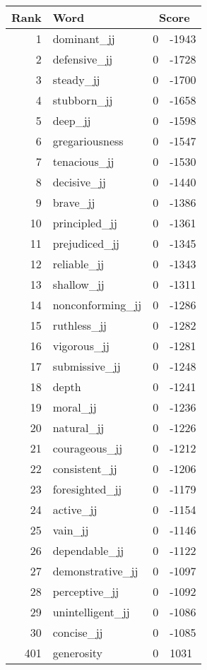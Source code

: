 \begin{longtable}[!htbp]{| rlr@{.}l |}
    \hline
    \textbf{Rank} & \textbf{Word} & \multicolumn{2}{c|}{\textbf{Score}} \\
    \hline
    \endhead
    1 & dominant\_jj & 0 & -1943 \\
    2 & defensive\_jj & 0 & -1728 \\
    3 & steady\_jj & 0 & -1700 \\
    4 & stubborn\_jj & 0 & -1658 \\
    5 & deep\_jj & 0 & -1598 \\
    6 & gregariousness & 0 & -1547 \\
    7 & tenacious\_jj & 0 & -1530 \\
    8 & decisive\_jj & 0 & -1440 \\
    9 & brave\_jj & 0 & -1386 \\
    10 & principled\_jj & 0 & -1361 \\
    11 & prejudiced\_jj & 0 & -1345 \\
    12 & reliable\_jj & 0 & -1343 \\
    13 & shallow\_jj & 0 & -1311 \\
    14 & nonconforming\_jj & 0 & -1286 \\
    15 & ruthless\_jj & 0 & -1282 \\
    16 & vigorous\_jj & 0 & -1281 \\
    17 & submissive\_jj & 0 & -1248 \\
    18 & depth & 0 & -1241 \\
    19 & moral\_jj & 0 & -1236 \\
    20 & natural\_jj & 0 & -1226 \\
    21 & courageous\_jj & 0 & -1212 \\
    22 & consistent\_jj & 0 & -1206 \\
    23 & foresighted\_jj & 0 & -1179 \\
    24 & active\_jj & 0 & -1154 \\
    25 & vain\_jj & 0 & -1146 \\
    26 & dependable\_jj & 0 & -1122 \\
    27 & demonstrative\_jj & 0 & -1097 \\
    28 & perceptive\_jj & 0 & -1092 \\
    29 & unintelligent\_jj & 0 & -1086 \\
    30 & concise\_jj & 0 & -1085 \\
    401 & generosity & 0 & 1031 \\

\end{longtable}
